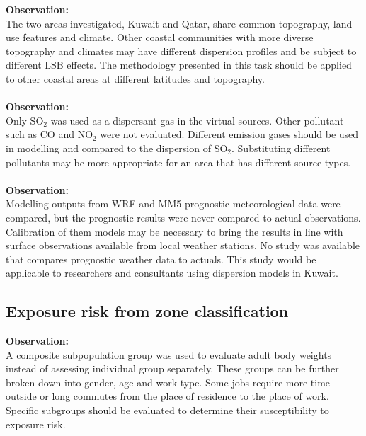 \noindent
\textbf{Observation:}\\
The two areas investigated, Kuwait and Qatar, share common topography, land use features and climate. Other coastal communities with more diverse topography and climates may have different dispersion profiles and be subject to different LSB effects. The methodology  presented in this task should be applied to other coastal areas at different latitudes and topography.\\
\noindent\\
\textbf{Observation:}\\
Only SO$_{2}$ was used as a dispersant gas in the virtual sources. Other pollutant such as CO and NO$_{2}$ were not evaluated. Different emission gases should be used in modelling and compared to the dispersion of SO$_{2}$. Substituting different pollutants may be more appropriate for an area that has different source types.\\
\noindent\\
\textbf{Observation:}\\
Modelling outputs from WRF and MM5 prognostic meteorological data were compared, but the prognostic results were never compared to actual observations. Calibration of them models may be necessary to bring the results in line with surface observations available from local weather stations. No study was available that compares prognostic weather data to actuals. This study would be applicable to researchers and consultants using dispersion models in Kuwait.

\subsection*{Exposure risk from zone classification}
\noindent
\textbf{Observation:}\\
A composite subpopulation group was used to evaluate adult body weights instead of assessing individual group separately. These groups can be further broken down into gender, age and work type. Some jobs require more time outside or long commutes from the place of residence to the place of work. Specific subgroups should be evaluated to determine their susceptibility to exposure risk.\\

